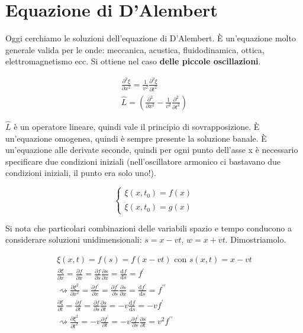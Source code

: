 \section{Equazione di D'Alembert}

Oggi cerchiamo le soluzioni dell'equazione di D'Alembert. È un'equazione molto generale valida per le onde: meccanica, acustica, fluidodinamica, ottica, elettromagnetismo ecc. Si ottiene nel caso \textbf{delle piccole oscillazioni}.

\begin{gather*}
	\frac{\partial ^{2} \xi }{\partial x^{2} } = \frac{1}{v^{2} }\frac{\partial ^{2} \xi }{\partial t ^{2} }\\
	\hat{L} = \left(\frac{\partial ^{2} }{\partial x^{2} } - \frac{1}{v^{2} }\frac{\partial ^{2} }{\partial t ^{2} }\right) 
\end{gather*}

\(\hat{L} \) è un operatore lineare, quindi vale il principio di sovrapposizione. È un'equazione omogenea, quindi è sempre presente la soluzione banale. È un'equazione alle derivate seconde, quindi per ogni punto dell'asse x è necessario specificare due condizioni iniziali (nell'oscillatore armonico ci bastavano due condizioni iniziali, il punto era solo uno!).

\[
	\begin{cases}
		\xi (x, t_0) = f(x)\\
		\dot{\xi } (x, t_0) = g(x) 
	\end{cases}	
\]

Si nota che particolari combinazioni delle variabili spazio e tempo conducono a considerare soluzioni unidimensionali: \(s=x-vt\), \(w=x+vt\). Dimostriamolo.

\begin{gather}
	\xi (x,t) = f(s) = f(x-vt) \text{ con } s(x,t)=x-vt\\
	\frac{\partial \xi }{\partial x} = \frac{\partial f}{\partial x} = \frac{\partial f}{\partial s} \frac{\partial s}{\partial x} = \frac{\mathrm{d}f}{\mathrm{d}s} = f^{\prime} \\
	\rightsquigarrow \frac{\partial \xi ^{2} }{\partial x^{2} } = \frac{\partial f^{\prime} }{\partial x} = \frac{\partial f^{\prime} }{\partial s} \frac{\partial s}{\partial x} = \frac{\mathrm{d}f^{\prime} }{\mathrm{d}s} = f^{\prime\prime} \\
	\frac{\partial \xi }{\partial t} = \frac{\partial f}{\partial t} = \frac{\partial f}{\partial s} \frac{\partial s}{\partial t} = -v \frac{\mathrm{d}f}{\mathrm{d}s} = - v f^{\prime} \\
	\rightsquigarrow \frac{\partial \xi ^{2} }{\partial t^{2} } = -v \frac{\partial f^{\prime} }{\partial t}  = - v \frac{\partial f^{\prime} }{\partial s} \frac{\partial s}{\partial t} = v ^{2} f^{\prime\prime} 
\end{gather}


